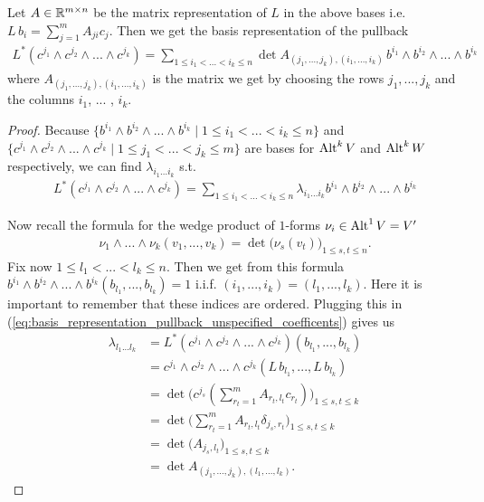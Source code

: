 \documentclass[../master_thesis.tex]{subfiles}
\begin{document}
\begin{proposition}
    Let $A \in \mathbb{R}^{m\times n}$ be the matrix representation of $L$ in the 
    above bases i.e.
    $L\,b_i = \sum_{j=1}^m A_{ji} c_j$. Then we get the basis representation 
    of the pullback 
    \begin{align}
        L^* (c^{j_1} \wedge c^{j_2} \wedge ... \wedge c^{j_k})
        = \sum\limits_{1 \leq i_1 < ... < i_k \leq n} 
            \det A_{(j_1,...,j_k),(i_1,...,i_k)} \,
            b^{i_1} \wedge b^{i_2} \wedge ... \wedge b^{i_k}
        \label{eq:basis_representation_pullback}
    \end{align}
    where $A_{(j_1,...,j_k),(i_1,...,i_k)}$ is the matrix we get 
    by choosing the rows $j_1,...,j_k$  and the columns $i_1$, ... , $i_k$. 
\end{proposition}
\begin{proof}
    Because $\{ b^{i_1}\wedge b^{i_2}\wedge ... \wedge b^{i_k} 
    \mid 1 \leq i_1 < ... < i_k  \leq n \}$ and 
    $\{ c^{j_1}\wedge c^{j_2}\wedge ... \wedge c^{j_k} 
    \mid 1 \leq j_1 < ... < j_k  \leq m \}$ are bases for ${\text{Alt}^{k}\,V}$ 
    and ${\text{Alt}^{k}\,W}$ respectively, we can find $\lambda_{i_1 ... i_k}$ s.t.
    \begin{align}
        L^* (c^{j_1} \wedge c^{j_2} \wedge ... \wedge c^{j_k})
        = \sum\limits_{1 \leq i_1 < ... < i_k \leq n} 
        \lambda_{i_1 ... i_k} b^{i_1} \wedge b^{i_2} \wedge ... \wedge b^{i_k}
        \label{eq:basis_representation_pullback_unspecified_coefficents}
    \end{align}

    Now recall the formula for the wedge product of $1$-forms 
    $\nu_i \in {\text{Alt}^{1}\,V} = V'$
    \begin{align*}
        \nu_1 \wedge ... \wedge \nu_k (v_1,...,v_k) = 
        \det \big( \nu_s(v_t) \big)_{1 \leq s,t \leq n}.
    \end{align*}
    Fix now $1 \leq l_1 < ... <  l_k \leq n$. Then we get from this formula
    $b^{i_1} \wedge b^{i_2} \wedge ... \wedge b^{i_k} ( b_{l_1},...,b_{l_k}) = 1$ 
    i.i.f. $(i_1,...,i_k) = (l_1,...,l_k)$. Here it is important to remember that 
    these indices are ordered. Plugging this in 
    (\ref{eq:basis_representation_pullback_unspecified_coefficents}) gives us 
    \begin{align*}
        \lambda_{l_1 ... l_k}  &= 
            L^* (c^{j_1} \wedge c^{j_2} \wedge ... \wedge c^{j_k})
            (b_{l_1},...,b_{l_k})
        \\ &= c^{j_1} \wedge c^{j_2} \wedge ... \wedge c^{j_k} 
            (L\,b_{l_1},...,L\,b_{l_k})
        \\ &= \det \big( c^{j_s}(\sum_{r_t = 1}^m A_{r_t,l_t}c_{r_t}) 
            \big)_{1 \leq s,t \leq k}
        \\ &= \det \big( \sum_{r_t = 1}^m A_{r_t,l_t} \delta_{j_s,r_t}
            \big)_{1 \leq s,t \leq k}
        \\ &= \det \big( A_{j_s,l_t} \big)_{1 \leq s,t \leq k}
        \\ &= \det A_{(j_1,...,j_k),(l_1,...,l_k)}.
    \end{align*}
\end{proof}
\end{document}
